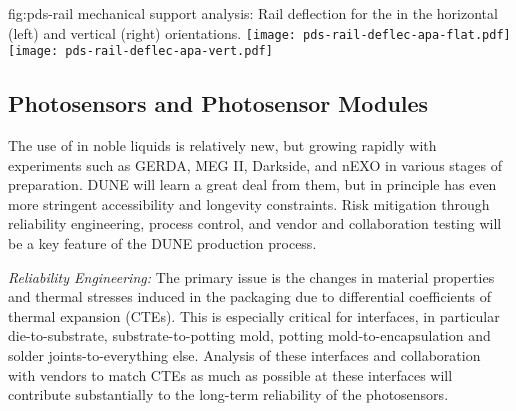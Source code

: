 
\begin{dunefigure}{fig:pds-rail}
{ mechanical support analysis: Rail deflection for the  in the horizontal (left) and vertical (right) orientations.}
	\texttt{[image: pds-rail-deflec-apa-flat.pdf]} 
	\texttt{[image: pds-rail-deflec-apa-vert.pdf]}\\
\end{dunefigure}


\subsection{Photosensors and Photosensor Modules}
\label{sec:fdsp-pd-assy-psm}


The use of  in noble liquids is relatively new, but growing rapidly with experiments such as GERDA, MEG II, Darkside, and nEXO in various stages of preparation.
DUNE will learn a great deal from them, but in principle has even more stringent accessibility and longevity constraints. Risk mitigation through reliability engineering, process control, and vendor and collaboration testing will be a key feature of the DUNE  production process.

{\textit{Reliability Engineering:}} The primary issue is the changes in material properties and thermal stresses induced in the packaging due to differential coefficients of thermal expansion (CTEs). This is especially critical for interfaces, in particular
die-to-substrate, substrate-to-potting mold, potting mold-to-encapsulation and solder joints-to-everything else. Analysis of these interfaces and collaboration with vendors to match CTEs as much as possible at these interfaces will contribute substantially to the long-term reliability of the photosensors.


